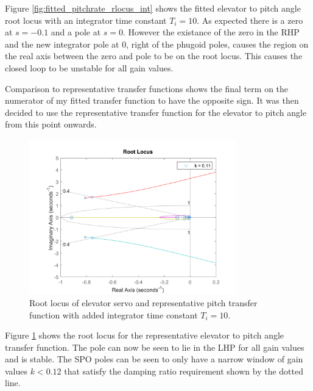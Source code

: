 \documentclass{article}
\begin{document}
Figure \ref{fig:fitted_pitchrate_rlocus_int} shows the fitted elevator to pitch angle root locus with an integrator time constant $T_i = 10$.
As expected there is a zero at $s=-0.1$ and a pole at $s=0$.
However the existance of the zero in the RHP and the new integrator pole at 0, right of the phugoid poles, causes the region on the real axis between the zero and pole to be on the root locus.
This causes the closed loop to be unstable for all gain values.

Comparison to representative transfer functions \cite{rep} shows the final term on the numerator of my fitted transfer function to have the opposite sign.
It was then decided to use the representative transfer function for the elevator to pitch angle from this point onwards.

\begin{figure}[H]
    \centering
    \includegraphics[width=0.8\textwidth]{figures/pitch_autopilot_locus_Ti.png}
    \caption{Root locus of elevator servo and representative pitch transfer function \cite{rep} with added integrator time constant $T_i = 10$.}
    \label{fig:representative_pitchrate_rlocus_int}
\end{figure}

Figure \ref{fig:representative_pitchrate_rlocus_int} shows the root locus for the representative elevator to pitch angle transfer function.
The pole can now be seen to lie in the LHP for all gain values and is stable.
The SPO poles can be seen to only have a narrow window of gain values $k < 0.12$ that satisfy the damping ratio requirement shown by the dotted line.
\end{document}
